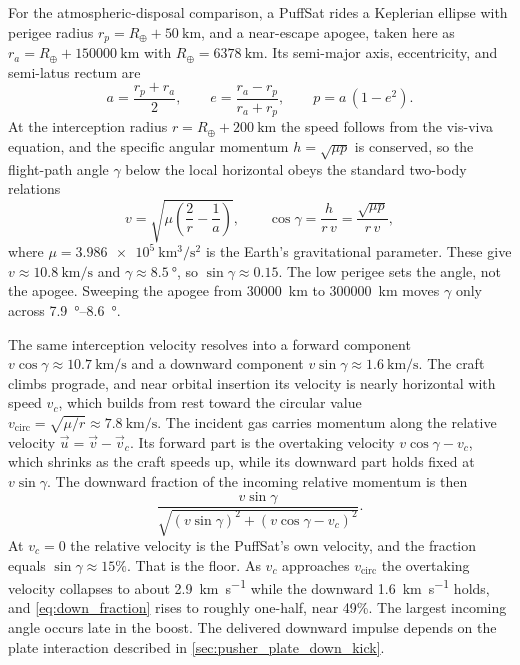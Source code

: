\documentclass{article}
\begin{document}
For the atmospheric-disposal comparison, a PuffSat rides a Keplerian ellipse with perigee radius $r_p = R_\oplus + \SI{50}{\kilo\meter}$, and a near-escape apogee, taken here as $r_a = R_\oplus + \SI{150000}{\kilo\meter}$ with $R_\oplus = \SI{6378}{\kilo\meter}$. Its semi-major axis, eccentricity, and semi-latus rectum are
\begin{equation}
a = \frac{r_p + r_a}{2}, \qquad e = \frac{r_a - r_p}{r_a + r_p}, \qquad p = a\,(1 - e^2).
\end{equation}
At the interception radius $r = R_\oplus + \SI{200}{\kilo\meter}$ the speed follows from the vis-viva equation, and the specific angular momentum $h = \sqrt{\mu p}$ is conserved, so the flight-path angle $\gamma$ below the local horizontal obeys the standard two-body relations \cite{vallado_astrodynamics}
\begin{equation}
v = \sqrt{\mu\!\left(\frac{2}{r} - \frac{1}{a}\right)}, \qquad \cos\gamma = \frac{h}{r\,v} = \frac{\sqrt{\mu p}}{r\,v},
\end{equation}
where $\mu = \SI{3.986e5}{\kilo\meter\cubed\per\second\squared}$ is the Earth's gravitational parameter. These give $v \approx \SI{10.8}{\kilo\meter\per\second}$ and $\gamma \approx \SI{8.5}{\degree}$, so $\sin\gamma \approx 0.15$. The low perigee sets the angle, not the apogee. Sweeping the apogee from \SI{30000}{\kilo\meter} to \SI{300000}{\kilo\meter} moves $\gamma$ only across \SIrange{7.9}{8.6}{\degree}.

The same interception velocity resolves into a forward component $v\cos\gamma \approx \SI{10.7}{\kilo\meter\per\second}$ and a downward component $v\sin\gamma \approx \SI{1.6}{\kilo\meter\per\second}$. The craft climbs prograde, and near orbital insertion its velocity is nearly horizontal with speed $v_c$, which builds from rest toward the circular value $v_{\mathrm{circ}} = \sqrt{\mu/r} \approx \SI{7.8}{\kilo\meter\per\second}$. The incident gas carries momentum along the relative velocity $\vec{u} = \vec{v} - \vec{v}_c$. Its forward part is the overtaking velocity $v\cos\gamma - v_c$, which shrinks as the craft speeds up, while its downward part holds fixed at $v\sin\gamma$. The downward fraction of the incoming relative momentum is then
\begin{equation}
\frac{v\sin\gamma}{\sqrt{(v\sin\gamma)^2 + (v\cos\gamma - v_c)^2}}.
\label{eq:down_fraction}
\end{equation}
At $v_c = 0$ the relative velocity is the PuffSat's own velocity, and the fraction equals $\sin\gamma \approx 15\%$. That is the floor. As $v_c$ approaches $v_{\mathrm{circ}}$ the overtaking velocity collapses to about \SI{2.9}{\kilo\meter\per\second} while the downward \SI{1.6}{\kilo\meter\per\second} holds, and \autoref{eq:down_fraction} rises to roughly one-half, near 49\%. The largest incoming angle occurs late in the boost. The delivered downward impulse depends on the plate interaction described in \autoref{sec:pusher_plate_down_kick}.
\end{document}
